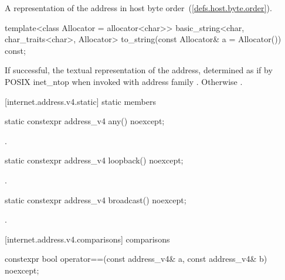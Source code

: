 \begin{itemdescr}
\pnum
\returns A representation of the address in host byte order~(\ref{defs.host.byte.order}).
\end{itemdescr}

\begin{itemdecl}
template<class Allocator = allocator<char>>
  basic_string<char, char_traits<char>, Allocator>
    to_string(const Allocator& a = Allocator()) const;
\end{itemdecl}

\begin{itemdescr}
\pnum
\returns If successful, the textual representation of the address, determined as if by POSIX inet_ntop when invoked with address family . Otherwise .
\end{itemdescr}



[internet.address.v4.static]{ static members}

\begin{itemdecl}
static constexpr address_v4 any() noexcept;
\end{itemdecl}

\begin{itemdescr}
\pnum
\returns {}.
\end{itemdescr}

\begin{itemdecl}
static constexpr address_v4 loopback() noexcept;
\end{itemdecl}

\begin{itemdescr}
\pnum
\returns {}.
\end{itemdescr}

\begin{itemdecl}
static constexpr address_v4 broadcast() noexcept;
\end{itemdecl}

\begin{itemdescr}
\pnum
\returns {}.
\end{itemdescr}



[internet.address.v4.comparisons]{ comparisons}

\begin{itemdecl}
constexpr bool operator==(const address_v4& a, const address_v4& b) noexcept;
\end{itemdecl}

